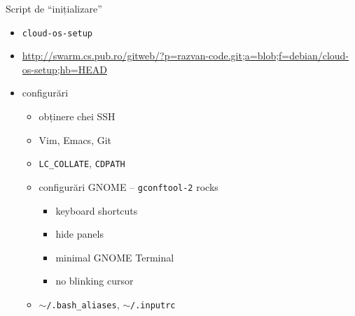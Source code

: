 \documentclass{beamer}
\begin{document}
\begin{frame}{Script de ``inițializare''}
  \begin{itemize}
    \item \texttt{cloud-os-setup}
    \item
    \url{http://swarm.cs.pub.ro/gitweb/?p=razvan-code.git;a=blob;f=debian/cloud-os-setup;hb=HEAD}
    \item configurări
      \begin{itemize}
        \item obținere chei SSH
        \item Vim, Emacs, Git
        \item \texttt{LC\_COLLATE}, \texttt{CDPATH}
        \item configurări GNOME -- \texttt{gconftool-2} rocks
          \begin{itemize}
            \item keyboard shortcuts
            \item hide panels
            \item minimal GNOME Terminal
            \item no blinking cursor
          \end{itemize}
        \item \texttt{$\sim$/.bash\_aliases}, \texttt{$\sim$/.inputrc}
      \end{itemize}
  \end{itemize}
\end{frame}
\end{document}
